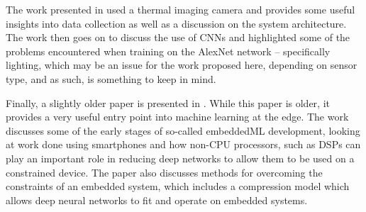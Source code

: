 \documentclass[conference]{IEEEtran}
\begin{document}
The work presented in \cite{quinn} used a thermal imaging camera and provides some useful insights into data collection as well as a discussion on the system architecture. The work then goes on to discuss the use of CNNs and highlighted some of the problems encountered when training on the AlexNet network – specifically lighting, which may be an issue for the work proposed here, depending on sensor type, and as such, is something to keep in mind.


Finally, a slightly older paper is presented in \cite{lane}. While this paper is older, it provides a very useful entry point into machine learning at the edge. The work discusses some of the early stages of so-called embeddedML development, looking at work done using smartphones and how non-CPU processors, such as DSPs can play an important role in reducing deep networks to allow them to be used on a constrained device. The paper also discusses methods for overcoming the constraints of an embedded system, which includes a compression model which allows deep neural networks to fit and operate on embedded systems. 






\printbibliography
\vspace{12pt}
\end{document}
